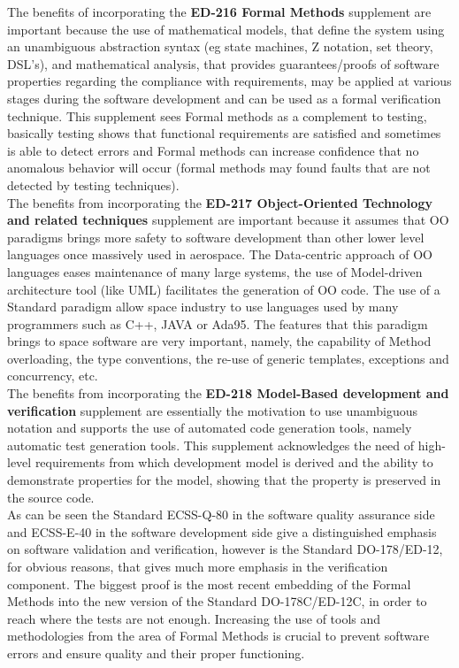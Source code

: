 The benefits of incorporating the \textbf{ED-216 Formal Methods} supplement are important because
the use of mathematical models, that define the system using an unambiguous abstraction syntax (eg state machines, Z notation, set theory, \ac{DSL}'s),
and mathematical analysis, that provides guarantees/proofs of software properties regarding the compliance with requirements,
may be applied at various stages during the software development and can be used as a formal verification technique.
This supplement sees Formal methods as a complement to testing, basically testing shows that functional requirements
are satisfied and sometimes is able to detect errors and Formal methods can increase confidence that no anomalous behavior will occur
(formal methods may found faults that are not detected by testing techniques)\cite{Chelini:2009:WTD:1647420.1647443}.\\
The benefits from incorporating the \textbf{ED-217 Object-Oriented Technology and related techniques} supplement are important because
it assumes that \ac{OO} paradigms brings more safety to software development than other lower level languages once massively used in aerospace.
The Data-centric approach of \ac{OO} languages eases maintenance of many large systems, the use of Model-driven architecture tool (like \ac{UML}) facilitates
the generation of \ac{OO} code\cite{Elliott:2010:OSC:1869542.1869558}. The use of a Standard paradigm allow space industry to use languages used by many programmers such as C++, JAVA or Ada95.
The features that this paradigm brings to space software are very important, namely, the capability of Method overloading, the type conventions, the re-use of
generic templates, exceptions and concurrency, etc.\\
The benefits from incorporating the \textbf{ED-218 Model-Based development and verification} supplement are essentially the motivation to use unambiguous notation and supports the use of
automated code generation tools, namely automatic test generation tools\cite{Chelini:2009:WTD:1647420.1647443}. This supplement acknowledges the need of
high-level requirements from which development model is derived and the ability to demonstrate properties for the model, showing that the property 
is preserved in the source code.\\

As can be seen the Standard ECSS-Q-80\cite{ecss-q-st-80c} in the software quality assurance side and ECSS-E-40\cite{ecss-e-st-40c} in the software development side
give a distinguished emphasis on software validation and verification, however is the Standard DO-178/ED-12, for obvious reasons,
that gives much more emphasis in the verification component. The biggest proof is the most recent embedding of the Formal Methods into the
new version of the Standard DO-178C/ED-12C\cite{ed-12c}, in order to reach where the tests are not enough.
Increasing the use of tools and methodologies from the area of Formal Methods is crucial to prevent software errors and ensure quality and their proper functioning.

